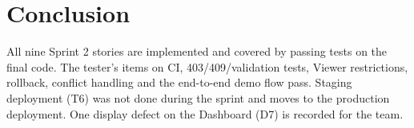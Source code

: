 \documentclass[11pt,a4paper]{article}
\begin{document}
\section{Conclusion}
All nine Sprint 2 stories are implemented and covered by passing tests on the final code. The tester's items on CI, 403/409/validation tests,
Viewer restrictions, rollback, conflict handling and the end-to-end demo flow pass. Staging deployment (T6) was not done during the sprint
and moves to the production deployment. One display defect on the Dashboard (D7) is recorded for the team.

\end{document}
